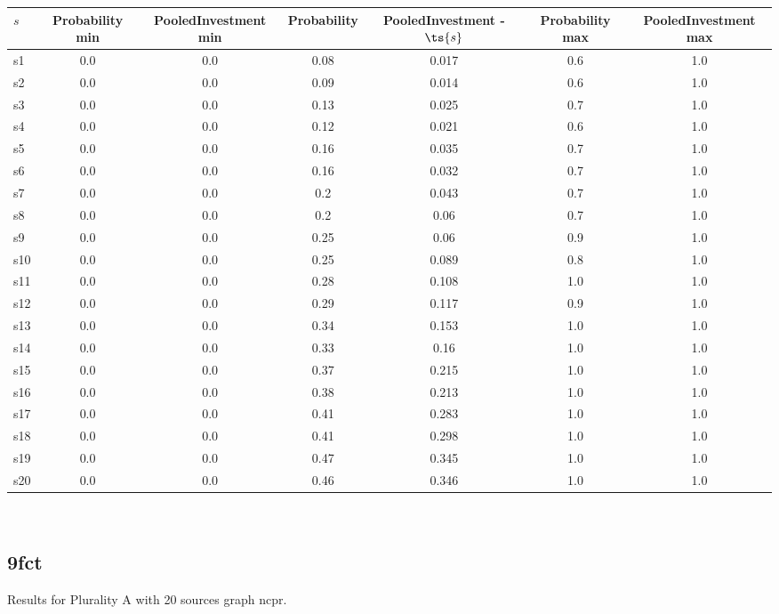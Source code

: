 \documentclass{article}
\begin{document}
\noindent\begin{tabular}{|l|c|c|c|c|c|c|}
\hline
$s$& Probability min & PooledInvestment min & Probability & PooledInvestment - $\ts{s}$ & Probability max & PooledInvestment max\\
\hline
s1 &0.0 & 0.0 & 0.08 & 0.017 & 0.6 & 1.0\\
\hline
s2 &0.0 & 0.0 & 0.09 & 0.014 & 0.6 & 1.0\\
\hline
s3 &0.0 & 0.0 & 0.13 & 0.025 & 0.7 & 1.0\\
\hline
s4 &0.0 & 0.0 & 0.12 & 0.021 & 0.6 & 1.0\\
\hline
s5 &0.0 & 0.0 & 0.16 & 0.035 & 0.7 & 1.0\\
\hline
s6 &0.0 & 0.0 & 0.16 & 0.032 & 0.7 & 1.0\\
\hline
s7 &0.0 & 0.0 & 0.2 & 0.043 & 0.7 & 1.0\\
\hline
s8 &0.0 & 0.0 & 0.2 & 0.06 & 0.7 & 1.0\\
\hline
s9 &0.0 & 0.0 & 0.25 & 0.06 & 0.9 & 1.0\\
\hline
s10 &0.0 & 0.0 & 0.25 & 0.089 & 0.8 & 1.0\\
\hline
s11 &0.0 & 0.0 & 0.28 & 0.108 & 1.0 & 1.0\\
\hline
s12 &0.0 & 0.0 & 0.29 & 0.117 & 0.9 & 1.0\\
\hline
s13 &0.0 & 0.0 & 0.34 & 0.153 & 1.0 & 1.0\\
\hline
s14 &0.0 & 0.0 & 0.33 & 0.16 & 1.0 & 1.0\\
\hline
s15 &0.0 & 0.0 & 0.37 & 0.215 & 1.0 & 1.0\\
\hline
s16 &0.0 & 0.0 & 0.38 & 0.213 & 1.0 & 1.0\\
\hline
s17 &0.0 & 0.0 & 0.41 & 0.283 & 1.0 & 1.0\\
\hline
s18 &0.0 & 0.0 & 0.41 & 0.298 & 1.0 & 1.0\\
\hline
s19 &0.0 & 0.0 & 0.47 & 0.345 & 1.0 & 1.0\\
\hline
s20 &0.0 & 0.0 & 0.46 & 0.346 & 1.0 & 1.0\\
\hline
\end{tabular}\\

\newpage

\subsection{9fct}

\noindent Results for Plurality A with 20 sources graph ncpr.
\end{document}
